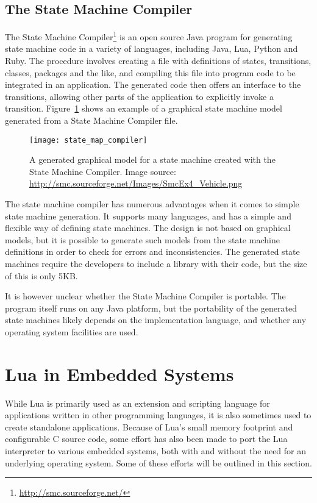 \subsection{The State Machine Compiler}
\label{sec:state_machine_compiler}
The State Machine Compiler\footnote{\url{http://smc.sourceforge.net/}} is an open source Java program for generating state machine code in a variety of languages, including Java, Lua, Python and Ruby. The procedure involves creating a file with definitions of states, transitions, classes, packages and the like, and compiling this file into program code to be integrated in an application. The generated code then offers an interface to the transitions, allowing other parts of the application to explicitly invoke a transition. Figure~\ref{fig:state_map_compiler} shows an example of a graphical state machine model generated from a State Machine Compiler file.

\begin{figure}[htp]
	\centering
	\texttt{[image: state\_map\_compiler]}
	\caption[A state machine created with the State Machine Compiler]{A generated graphical model for a state machine created with the State Machine Compiler. Image source: \url{http://smc.sourceforge.net/Images/SmcEx4_Vehicle.png}} \label{fig:state_map_compiler}
\end{figure}

The state machine compiler has numerous advantages when it comes to simple state machine generation. It supports many languages, and has a simple and flexible way of defining state machines. The design is not based on graphical models, but it is possible to generate such models from the state machine definitions in order to check for errors and inconsistencies. The generated state machines require the developers to include a library with their code, but the size of this is only 5KB.

It is however unclear whether the State Machine Compiler is portable. The program itself runs on any Java platform, but the portability of the generated state machines likely depends on the implementation language, and whether any operating system facilities are used.

\section{Lua in Embedded Systems}
\label{sec:lua_in_embedded}
While Lua is primarily used as an extension and scripting language for applications written in other programming languages, it is also sometimes used to create standalone applications. Because of Lua's small memory footprint and configurable C source code, some effort has also been made to port the Lua interpreter to various embedded systems, both with and without the need for an underlying operating system. Some of these efforts will be outlined in this section.

